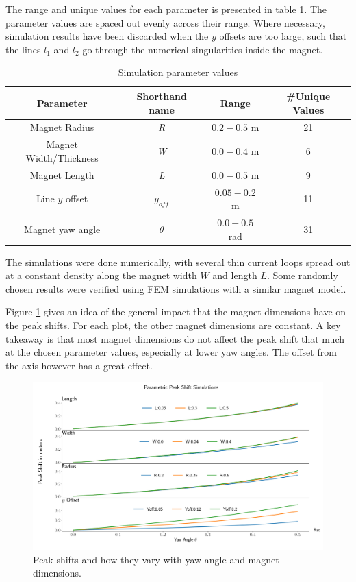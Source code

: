 The range and unique values for each parameter is presented in table \ref{tab:parameter-vals}.
The parameter values are spaced out evenly across their range. Where necessary, simulation
results have been discarded when the $y$ offsets are too large, such that the lines $l_1$
and $l_2$ go through the numerical singularities inside the magnet.

\begin{table}[h!]
    \begin{center}
        \begin{tabular}{c c c c}
            Parameter              & Shorthand name & Range         & \#Unique Values \\
            \hline
            Magnet Radius          & \emph{R}       & $0.2-0.5$ m   & 21              \\
            Magnet Width/Thickness & \emph{W}       & $0.0-0.4$ m   & 6               \\
            Magnet Length          & \emph{L}       & $0.0-0.5$ m   & 9               \\
            Line $y$ offset        & $y_{off}$      & $0.05-0.2$ m  & 11              \\
            Magnet yaw angle       & $\theta$       & $0.0-0.5$ rad & 31
        \end{tabular}
        \caption{Simulation parameter values}
        \label{tab:parameter-vals}
    \end{center}
\end{table}

The simulations were done numerically, with several thin
current loops spread out at a constant density along the magnet
width $W$ and length $L$. Some randomly chosen results were
verified using FEM simulations with a similar magnet model.

Figure \ref{fig:sim-mag-dimensions} gives an idea of the general impact that the
magnet dimensions have on the peak shifts. For each plot, the other magnet dimensions
are constant. A key takeaway is that most magnet dimensions do not affect
the peak shift that much at the chosen parameter values, especially at
lower yaw angles. The offset from the axis however has a great effect.


\begin{figure}
    \centering
    \includegraphics[width=\linewidth]{figs/sim_params_plot}
    \caption{Peak shifts and how they vary with yaw angle and magnet dimensions.}
    \label{fig:sim-mag-dimensions}
\end{figure}

